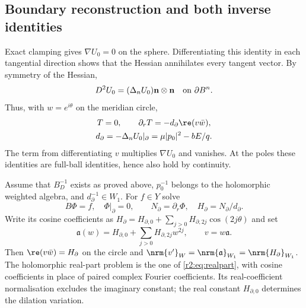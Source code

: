 \subsection{Boundary reconstruction and both inverse identities}
\label{gd:sec:inverse-identities}
Exact clamping gives $\nabla U_0=0$ on the sphere.
Differentiating this identity in each tangential direction shows that
the Hessian annihilates every tangent vector. By symmetry of the
Hessian,
\[
 D^2U_0=(\Delta_nU_0)\mathbf n\otimes\mathbf n\quad\hbox{on }\partial B^n .
\]
Thus, with $w=e^{i\theta}$ on the meridian circle,
\begin{equation}\label{gd:eq:boundary-material}
  \begin{gathered}
 T=0,\qquad \partial_rT=-d_\partial\re(v\bar w),\\
 d_\partial=-\Delta_nU_0|_\partial=\mu|p_0|^2-bE/q .
 \end{gathered}
\end{equation}
The term from differentiating $v$ multiplies $\nabla U_0$ and vanishes.
At the poles these identities are full-ball identities, hence also
hold by continuity.

Assume that $B_D^{-1}$ exists as proved above, $p_0^{-1}$ belongs
to the holomorphic weighted algebra, and $d_\partial^{-1}\in W_1$.
For $f\in Y$ solve
\begin{equation}\label{gd:eq:Dirichlet-recipe}
 B\Phi=f,\quad \Phi|_\partial=0,\qquad N_\partial=\partial_r\Phi,\quad H_\partial=N_\partial/d_\partial.
\end{equation}
Write its cosine coefficients as
$H_\partial=H_{\partial,0}+\sum_{j>0}H_{\partial,2j}\cos(2j\theta)$ and set
\begin{equation}\label{gd:eq:realpart-recipe}
 \mathfrak a(w)=H_{\partial,0}+\sum_{j>0}H_{\partial,2j}w^{2j},\qquad v=w\mathfrak a.
\end{equation}
Then $\re(v\bar w)=H_\partial$ on the circle and
$\nrm{v'}_W=\nrm{\mathfrak a}_{W_1}=\nrm{H_\partial}_{W_1}$.
The holomorphic real-part problem is the one of
\eqref{r2:eq:realpart}, with cosine coefficients in place of paired
complex Fourier coefficients. Its real-coefficient normalisation
excludes the imaginary constant; the real constant $H_{\partial,0}$ determines
the dilation variation.

